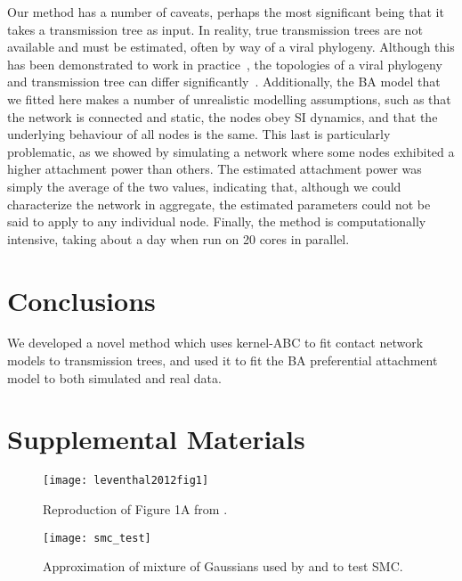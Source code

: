 \documentclass[12pt]{article}\usepackage[]{graphicx}\usepackage[]{color}
\begin{document}
Our method has a number of caveats, perhaps the most significant being that it
takes a transmission tree as input. In reality, true transmission trees are not
available and must be estimated, often by way of a viral phylogeny. Although
this has been demonstrated to work in practice~\autocite{leitner1996accurate},
the topologies of a viral phylogeny and transmission tree can differ
significantly~\autocite{ypma2013relating}. Additionally, the \gls{BA} model
that we fitted here makes a number of unrealistic modelling assumptions, such
as that the network is connected and static, the nodes obey \gls{SI} dynamics,
and that the underlying behaviour of all nodes is the same. This last is
particularly problematic, as we showed by simulating a network where some nodes
exhibited a higher attachment power than others. The estimated attachment power
was simply the average of the two values, indicating that, although we could
characterize the network in aggregate, the estimated parameters could not be
said to apply to any individual node. Finally, the method is computationally
intensive, taking about a day when run on 20 cores in parallel.

\section*{Conclusions}

We developed a novel method which uses kernel-\gls{ABC} to fit contact network
models to transmission trees, and used it to fit the \gls{BA} preferential
attachment model to both simulated and real data. 

\setcounter{figure}{0}
\renewcommand{\thefigure}{S\arabic{figure}}

\printbibliography

\section*{Supplemental Materials}

\begin{figure}
  \texttt{[image: leventhal2012fig1]}
  \caption{Reproduction of Figure 1A from \textcite{leventhal2012inferring}.}
  \label{fig:sf1}
\end{figure}

\begin{figure}
  \texttt{[image: smc\_test]}
  \caption{Approximation of mixture of Gaussians used by
    \textcite{del2012adaptive} and \textcite{sisson2007sequential} to test
    \gls{SMC}.}
  \label{fig:smctest}
\end{figure}
\end{document}
